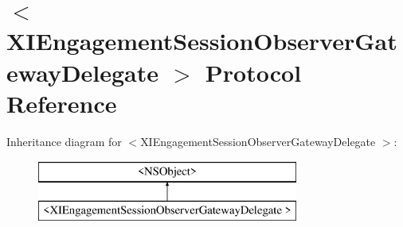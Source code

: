 \hypertarget{protocol_x_i_engagement_session_observer_gateway_delegate_01-p}{}\section{$<$X\+I\+Engagement\+Session\+Observer\+Gateway\+Delegate $>$ Protocol Reference}
\label{protocol_x_i_engagement_session_observer_gateway_delegate_01-p}
Inheritance diagram for $<$X\+I\+Engagement\+Session\+Observer\+Gateway\+Delegate $>$\+:\begin{figure}[H]
\begin{center}
\leavevmode
\includegraphics[height=2.000000cm]{protocol_x_i_engagement_session_observer_gateway_delegate_01-p}
\end{center}
\end{figure}
